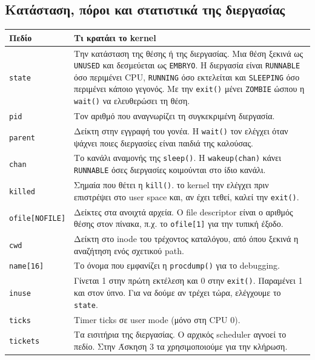 \documentclass[11pt,a4paper]{article}
\begin{document}
\subsection*{Κατάσταση, πόροι και στατιστικά της διεργασίας}
\begingroup\small
\begin{tabularx}{\textwidth}{@{}l X@{}}
\toprule
\textbf{Πεδίο} & \textbf{Τι κρατάει το kernel} \\
\midrule
\texttt{state} & Την κατάσταση της θέσης ή της διεργασίας. Μια θέση ξεκινά ως \texttt{UNUSED} και δεσμεύεται ως \texttt{EMBRYO}. Η διεργασία είναι \texttt{RUNNABLE} όσο περιμένει CPU, \texttt{RUNNING} όσο εκτελείται και \texttt{SLEEPING} όσο περιμένει κάποιο γεγονός. Με την \texttt{exit()} μένει \texttt{ZOMBIE} ώσπου η \texttt{wait()} να ελευθερώσει τη θέση. \\
\texttt{pid} & Τον αριθμό που αναγνωρίζει τη συγκεκριμένη διεργασία. \\
\texttt{parent} & Δείκτη στην εγγραφή του γονέα. Η \texttt{wait()} τον ελέγχει όταν ψάχνει ποιες διεργασίες είναι παιδιά της καλούσας. \\
\texttt{chan} & Το κανάλι αναμονής της \texttt{sleep()}. Η \texttt{wakeup(chan)} κάνει \texttt{RUNNABLE} όσες διεργασίες κοιμούνται στο ίδιο κανάλι. \\
\texttt{killed} & Σημαία που θέτει η \texttt{kill()}. το kernel την ελέγχει πριν επιστρέψει στο user space και, αν έχει τεθεί, καλεί την \texttt{exit()}. \\
\midrule
\texttt{ofile[NOFILE]} & Δείκτες στα ανοιχτά αρχεία. Ο file descriptor είναι ο αριθμός θέσης στον πίνακα, π.χ. το \texttt{ofile[1]} για την τυπική έξοδο. \\
\texttt{cwd} & Δείκτη στο inode του τρέχοντος καταλόγου, από όπου ξεκινά η αναζήτηση ενός σχετικού path. \\
\texttt{name[16]} & Το όνομα που εμφανίζει η \texttt{procdump()} για το debugging. \\
\midrule
\texttt{inuse} & Γίνεται 1 στην πρώτη εκτέλεση και 0 στην \texttt{exit()}. Παραμένει 1 και στον ύπνο. Για να δούμε αν τρέχει τώρα, ελέγχουμε το \texttt{state}. \\
\texttt{ticks} & Timer ticks σε user mode (μόνο στη CPU 0). \\
\texttt{tickets} & Τα εισιτήρια της διεργασίας. Ο αρχικός scheduler αγνοεί το πεδίο. Στην Άσκηση 3 τα χρησιμοποιούμε για την κλήρωση. \\
\bottomrule
\end{tabularx}
\endgroup
\end{document}

